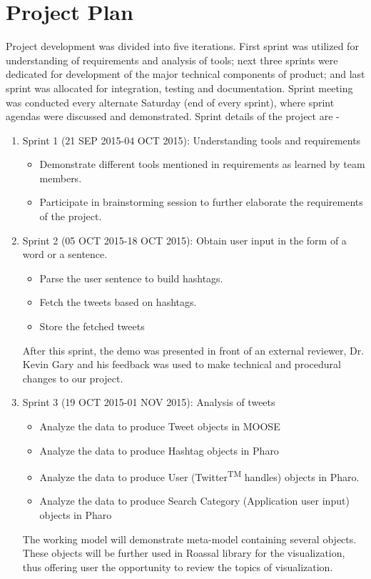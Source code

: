 \documentclass[11pt]{article}
\begin{document}
\section{Project Plan}
Project development was divided into five iterations. First sprint was utilized for understanding of requirements and analysis of tools; next three sprints were dedicated for development of the major technical components of product; and last sprint was allocated for integration, testing and documentation. Sprint meeting was conducted every alternate Saturday (end of every sprint), where sprint agendas were discussed and demonstrated. Sprint details of the project are - 
\begin{enumerate}
\item Sprint 1 (21 SEP 2015-04 OCT 2015): Understanding tools and requirements
\begin{itemize}
\item Demonstrate different tools mentioned in requirements as learned by team members. 
\item Participate in brainstorming session to further elaborate the requirements of the project. 
\end{itemize}

\item Sprint 2 (05 OCT 2015-18 OCT 2015): Obtain user input in the form of a word or a sentence.
\begin{itemize}
\item Parse the user sentence to build hashtags.
\item Fetch the tweets based on hashtags.
\item Store the fetched tweets
\end{itemize}
After this sprint, the demo was presented in front of an external reviewer, Dr. Kevin Gary and his feedback was used to make technical and procedural changes to our project.

\item  Sprint 3 (19 OCT 2015-01 NOV 2015): Analysis of tweets
\begin{itemize}
\item Analyze the data to produce Tweet objects in MOOSE
\item Analyze the data to produce Hashtag objects in Pharo
\item Analyze the data to produce User (Twitter\textsuperscript{TM} handles) objects in Pharo.
\item Analyze the data to produce Search Category (Application user input) objects in Pharo
\end{itemize}
The working model will demonstrate meta-model containing several objects. These objects will be further used in Roassal library for the visualization, thus offering user the opportunity to review the topics of visualization.


\end{enumerate}
\end{document}
